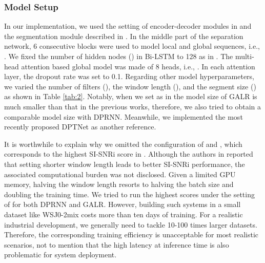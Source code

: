 \documentclass{article}
\begin{document}
\subsubsection{Model Setup}
In our implementation, we used the setting of encoder-decoder modules in \cite{luo2018tasnet, luo2019conv} and the segmentation module described in \cite{luo2019dual}. In the middle part of the separation network, 6 consecutive blocks were used to model local and global sequences, i.e., . We fixed the number of hidden nodes () in Bi-LSTM to 128 as in \cite{luo2019dual}. The multi-head attention based global model was made of 8 heads, i.e., . In each attention layer, the dropout rate was set to 0.1. Regarding other model hyperparameters, we varied the number of filters (), the window length (), and the segment size () as shown in Table \ref{tab:2}. Notably, when we set  as in \cite{luo2018tasnet, luo2019conv} the model size of GALR is much smaller than that in the previous works, therefore, we also tried  to obtain a comparable model size with DPRNN. Meanwhile, we implemented the most recently proposed DPTNet \cite{chen2020dual} as another reference.
\par
It is worthwhile to explain why we omitted the configuration of  and , which corresponds to the highest SI-SNRi score in \cite{luo2019dual}. Although the authors in \cite{luo2019dual} reported that setting shorter window length leads to better SI-SNRi performance, the associated computational burden was not disclosed. Given a limited GPU memory, halving the window length resorts to halving the batch size and doubling the training time. We tried to run the highest scores under the setting of  for both DPRNN and GALR. However, building such systems in a small dataset like WSJ0-2mix costs more than ten days of training. For a realistic industrial development, we generally need to tackle 10-100 times larger datasets. Therefore, the corresponding training efficiency is unacceptable for most realistic scenarios, not to mention that the high latency at inference time is also problematic for system deployment.
\end{document}
